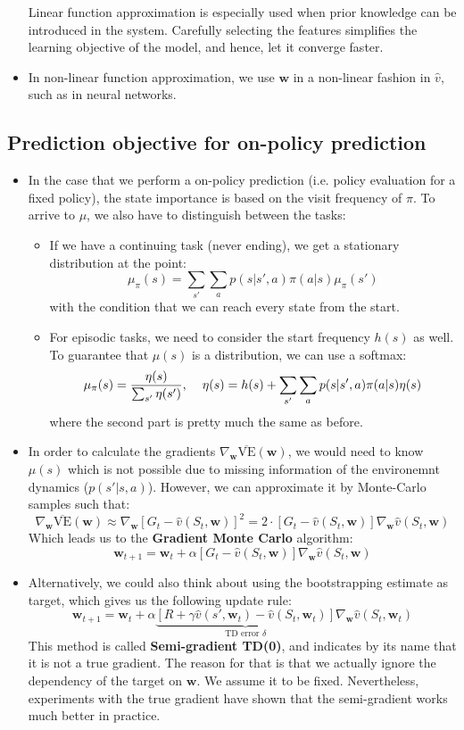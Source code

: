 \begin{itemize}
	Linear function approximation is especially used when prior knowledge can be introduced in the system. Carefully selecting the features simplifies the learning objective of the model, and hence, let it converge faster.
	
	\item In non-linear function approximation, we use $\bm{w}$ in a non-linear fashion in $\hat{v}$, such as in neural networks.
	
\end{itemize}
\subsection{Prediction objective for on-policy prediction}
\begin{itemize}
	\item In the case that we perform a on-policy prediction (i.e. policy evaluation for a fixed policy), the state importance is based on the visit frequency of $\pi$. To arrive to $\mu$, we also have to distinguish between the tasks:
	\begin{itemize}
		\item If we have a continuing task (never ending), we get a stationary distribution at the point:
		$$\mu_{\pi}(s)=\sum_{s'}\sum_{a}p(s|s',a)\pi(a|s)\mu_{\pi}(s')$$
		with the condition that we can reach every state from the start.
		\item For episodic tasks, we need to consider the start frequency $h(s)$ as well. To guarantee that $\mu(s)$ is a distribution, we can use a softmax:
		$$\mu_{\pi}(s)=\frac{\eta(s)}{\sum_{s'}\eta(s')}, \hspace{4mm}\eta(s)=h(s)+\sum_{s'}\sum_a p(s|s',a)\pi(a|s)\eta(s)$$
		where the second part is pretty much the same as before.
	\end{itemize} 
	\item In order to calculate the gradients $\nabla_{\bm{w}}\overline{\text{VE}}(\bm{w})$, we would need to know $\mu(s)$ which is not possible due to missing information of the environemnt dynamics ($p(s'|s,a)$). However, we can approximate it by Monte-Carlo samples such that:
	$$\nabla_{\bm{w}}\overline{\text{VE}}(\bm{w})\approx \nabla_{\bm{w}}\left[G_t - \hat{v}(S_t,\bm{w})\right]^2 = 2\cdot \left[G_t - \hat{v}(S_t,\bm{w})\right] \nabla_{\bm{w}}\hat{v}(S_t,\bm{w})$$
	Which leads us to the \textbf{Gradient Monte Carlo} algorithm:
	$$\bm{w}_{t+1}=\bm{w}_{t}+\alpha \left[G_t - \hat{v}(S_t,\bm{w})\right] \nabla_{\bm{w}}\hat{v}(S_t,\bm{w})$$
	\item Alternatively, we could also think about using the bootstrapping estimate as target, which gives us the following update rule:
	$$\bm{w}_{t+1}=\bm{w}_t + \alpha\underbrace{\left[R + \gamma\hat{v}(s',\bm{w}_t) - \hat{v}(S_t,\bm{w}_t)\right]}_{\text{TD error }\delta}\nabla_{\bm{w}}\hat{v}(S_t,\bm{w}_t)$$  
	This method is called \textbf{Semi-gradient TD(0)}, and indicates by its name that it is not a true gradient. The reason for that is that we actually ignore the dependency of the target on $\bm{w}$. We assume it to be fixed.  Nevertheless, experiments with the true gradient have shown that the semi-gradient works much better in practice.
	

\end{itemize}
